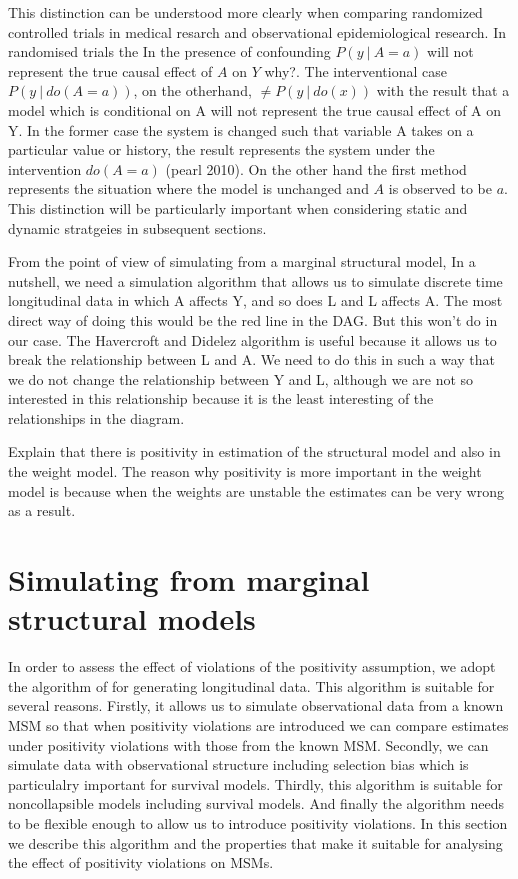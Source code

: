 \documentclass[11pt]{article}
\begin{document}
This distinction can be understood more clearly when comparing
randomized controlled trials in medical resarch and observational
epidemiological research. In randomised trials the In the presence of
confounding \(P(y\ |\ A=a)\) will not represent the true causal effect
of \(A\) on \(Y\) why?. The interventional case \(P(y\ |\ do(A=a))\), on
the otherhand, \(\ne P(y\ |\ do(x))\) with the result that a model which
is conditional on A will not represent the true causal effect of A on Y.
In the former case the system is changed such that variable A takes on a
particular value or history, the result represents the system under the
intervention \(do(A=a)\) (pearl 2010). On the other hand the first
method represents the situation where the model is unchanged and \(A\)
is observed to be \(a\). This distinction will be particularly important
when considering static and dynamic stratgeies in subsequent sections.

From the point of view of simulating from a marginal structural model,
In a nutshell, we need a simulation algorithm that allows us to simulate
discrete time longitudinal data in which A affects Y, and so does L and
L affects A. The most direct way of doing this would be the red line in
the DAG. But this won't do in our case. The Havercroft and Didelez
algorithm is useful because it allows us to break the relationship
between L and A. We need to do this in such a way that we do not change
the relationship between Y and L, although we are not so interested in
this relationship because it is the least interesting of the
relationships in the diagram.

Explain that there is positivity in estimation of the structural model
and also in the weight model. The reason why positivity is more
important in the weight model is because when the weights are unstable
the estimates can be very wrong as a result.

    \section{Simulating from marginal structural
models}\label{simulating-from-marginal-structural-models}

In order to assess the effect of violations of the positivity
assumption, we adopt the algorithm of \citet{Havercroft2012} for
generating longitudinal data. This algorithm is suitable for several
reasons. Firstly, it allows us to simulate observational data from a
known MSM so that when positivity violations are introduced we can
compare estimates under positivity violations with those from the known
MSM. Secondly, we can simulate data with observational structure
including selection bias which is particulalry important for survival
models. Thirdly, this algorithm is suitable for noncollapsible models
including survival models. And finally the algorithm needs to be
flexible enough to allow us to introduce positivity violations. In this
section we describe this algorithm and the properties that make it
suitable for analysing the effect of positivity violations on MSMs.
\end{document}
